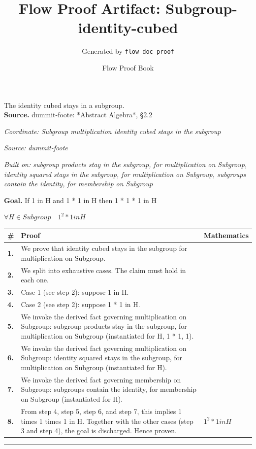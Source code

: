 \documentclass[11pt]{article}
\title{Flow Proof Artifact: Subgroup-identity-cubed}
\author{Generated by \texttt{flow doc proof}}
\date{Flow Proof Book}
\theoremstyle{definition}
\begin{document}
\maketitle
The identity cubed stays in a subgroup.\\[0.5em]
\textbf{Source.} dummit-foote: *Abstract Algebra*, §2.2\\[0.5em]
\bigskip
{}\par
\smallskip\noindent\textit{Coordinate: Subgroup \cdot multiplication \cdot identity cubed stays in the subgroup}\par
\smallskip\noindent\textit{Source: dummit-foote}\par
\smallskip\noindent\textit{Built on: subgroup products stay in the subgroup, for multiplication on Subgroup, identity squared stays in the subgroup, for multiplication on Subgroup, subgroups contain the identity, for membership on Subgroup}\par
\medskip
\noindent\textbf{Goal.} If 1 in H and 1 * 1 in H then 1 * 1 * 1 in H\par
\noindent$\displaystyle \forall H \in Subgroup\quad 1^{2} * 1 in H$\par
\medskip
\noindent
\begin{tabular}{@{} >{\raggedright\arraybackslash}p{} >{\raggedright\arraybackslash}p{} >{\raggedleft\arraybackslash}p{} @{}}
\textbf{\#} & \textbf{Proof} & \textbf{Mathematics} \\
\midrule
\textbf{1.} & We prove that identity cubed stays in the subgroup for multiplication on Subgroup. & \\[0.45em]
\textbf{2.} & We split into exhaustive cases. The claim must hold in each one. & \\[0.45em]
\textbf{3.} & Case 1 (see step 2): suppose 1 in H. & \\[0.45em]
\textbf{4.} & Case 2 (see step 2): suppose 1 * 1 in H. & \\[0.45em]
\textbf{5.} & We invoke the derived fact governing multiplication on Subgroup: subgroup products stay in the subgroup, for multiplication on Subgroup (instantiated for H, 1 * 1, 1). & \\[0.45em]
\textbf{6.} & We invoke the derived fact governing multiplication on Subgroup: identity squared stays in the subgroup, for multiplication on Subgroup (instantiated for H). & \\[0.45em]
\textbf{7.} & We invoke the derived fact governing membership on Subgroup: subgroups contain the identity, for membership on Subgroup (instantiated for H). & \\[0.45em]
\textbf{8.} & From step 4, step 5, step 6, and step 7, this implies 1 times 1 times 1 in H. Together with the other cases (step 3 and step 4), the goal is discharged. Hence proven. & $\displaystyle 1^{2} * 1 in H$ \\[0.45em]
\bottomrule
\end{tabular}
\label{thm:Subgroup-multiplication-identity_cubed_stays_in_the_subgroup}
\par\medskip\hrule
\end{document}

